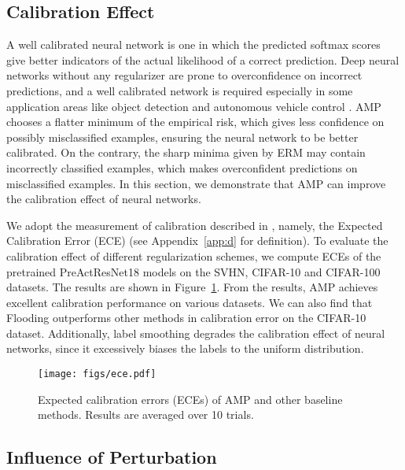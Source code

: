 \documentclass[final]{cvpr}
\begin{document}
\subsection{Calibration Effect}\label{sec:calibration}

A well calibrated neural network is one in which the predicted softmax scores give better indicators of the actual likelihood of a correct prediction. Deep neural networks without any regularizer are prone to overconfidence on incorrect predictions, and a well calibrated network is required especially in some application areas like object detection \cite{girshick2015fast,ren2015faster} and autonomous vehicle control \cite{chen2015deepdriving,levinson2011towards}. AMP chooses a flatter minimum of the empirical risk, which gives less confidence on possibly misclassified examples, ensuring the neural network to be better calibrated. On the contrary, the sharp minima given by ERM may contain incorrectly classified examples, which makes overconfident predictions on misclassified examples. In this section, we demonstrate that AMP can improve the calibration effect of neural networks.

We adopt the measurement of calibration described in \cite{guo2017calibration}, namely, the Expected Calibration Error (ECE) (see Appendix~\ref{app:d} for definition). To evaluate the calibration effect of different regularization schemes, we compute ECEs of the pretrained PreActResNet18 models on the SVHN, CIFAR-10 and CIFAR-100 datasets. The results are shown in Figure~\ref{fig:ece}. From the results, AMP achieves excellent calibration performance on various datasets. We can also find that Flooding outperforms other methods in calibration error on the CIFAR-10 dataset. Additionally, label smoothing degrades the calibration effect of neural networks, since it excessively biases the labels to the uniform distribution.

\begin{figure}[t]
\centering
\texttt{[image: figs/ece.pdf]}
\caption{Expected calibration errors (ECEs) of AMP and other baseline methods. Results are averaged over 10 trials.}
\label{fig:ece}
\end{figure}

\subsection{Influence of Perturbation}\label{sec:influence}
\end{document}
